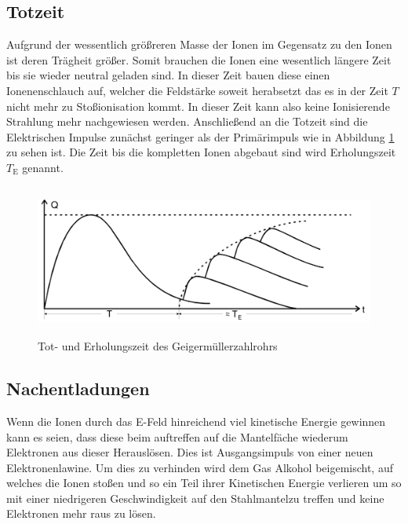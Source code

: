 \subsection{Totzeit} 
Aufgrund der wessentlich größreren Masse der Ionen im Gegensatz zu den Ionen ist deren Trägheit größer. Somit brauchen die Ionen eine wesentlich längere Zeit bis sie wieder neutral geladen sind. In dieser Zeit bauen diese einen Ionenenschlauch auf, welcher die Feldstärke soweit herabsetzt das es in der Zeit $T$ nicht mehr zu Stoßionisation kommt. In dieser Zeit kann also keine Ionisierende Strahlung mehr nachgewiesen werden. Anschließend an die Totzeit sind die Elektrischen Impulse zunächst geringer als der Primärimpuls wie in Abbildung \ref{fig:tot} zu sehen ist. Die Zeit bis die kompletten Ionen abgebaut sind wird Erholungszeit $T_\text{E}$ genannt. 
\begin{figure}
  \centering
  \includegraphics[height=5cm]{picture/Nachentladung.pdf}
  \caption{Tot- und Erholungszeit des Geigermüllerzahlrohrs \cite{sample}}
  \label{fig:tot}
\end{figure}

\subsection{Nachentladungen}
Wenn die Ionen durch das E-Feld hinreichend viel kinetische Energie gewinnen kann es seien, dass diese beim auftreffen auf die Mantelfäche wiederum Elektronen aus dieser Herauslösen. Dies ist Ausgangsimpuls von einer neuen Elektronenlawine. Um dies zu verhinden wird dem Gas Alkohol beigemischt, auf welches die Ionen stoßen und so ein Teil ihrer Kinetischen Energie verlieren um so mit einer niedrigeren Geschwindigkeit auf den Stahlmantelzu treffen und keine Elektronen mehr raus zu lösen. 


